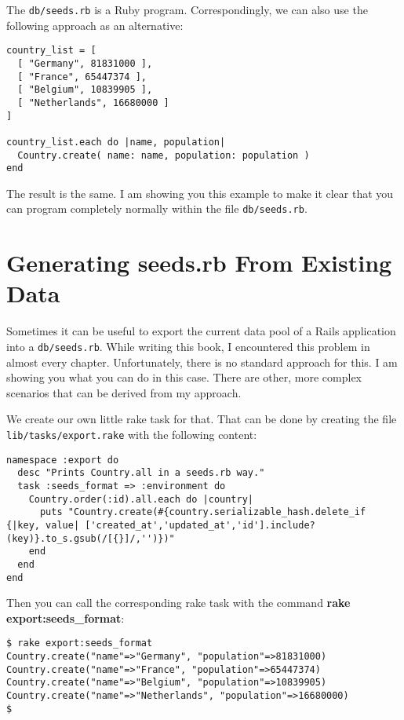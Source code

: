 \documentclass[a4paper]{book}
\begin{document}
The \texttt{db/seeds.rb} is a Ruby program. Correspondingly, we can also use the following approach as an alternative:

\begin{shaded}\begin{verbatim}
country_list = [
  [ "Germany", 81831000 ],
  [ "France", 65447374 ],
  [ "Belgium", 10839905 ],
  [ "Netherlands", 16680000 ]
]

country_list.each do |name, population|
  Country.create( name: name, population: population )
end
\end{verbatim}\end{shaded}

The result is the same. I am showing you this example to make it clear that you can program completely normally within the file \texttt{db/seeds.rb}.

\section{Generating seeds.rb From Existing Data}\label{generating-seeds.rb-from-existing-data}

Sometimes it can be useful to export the current data pool of a Rails application into a \texttt{db/seeds.rb}. While writing this book, I encountered this problem in almost every chapter. Unfortunately, there is no standard approach for this. I am showing you what you can do in this case. There are other, more complex scenarios that can be derived from my approach.

We create our own little rake task for that. That can be done by creating the file \texttt{lib/tasks/export.rake} with the following content:

\begin{shaded}\begin{verbatim}
namespace :export do
  desc "Prints Country.all in a seeds.rb way."
  task :seeds_format => :environment do
    Country.order(:id).all.each do |country|
      puts "Country.create(#{country.serializable_hash.delete_if {|key, value| ['created_at','updated_at','id'].include?(key)}.to_s.gsub(/[{}]/,'')})"
    end
  end
end
\end{verbatim}\end{shaded}

Then you can call the corresponding rake task with the command \textbf{rake export:seeds\_format}:

\begin{shaded}\begin{verbatim}
$ rake export:seeds_format
Country.create("name"=>"Germany", "population"=>81831000)
Country.create("name"=>"France", "population"=>65447374)
Country.create("name"=>"Belgium", "population"=>10839905)
Country.create("name"=>"Netherlands", "population"=>16680000)
$
\end{verbatim}\end{shaded}
\end{document}
